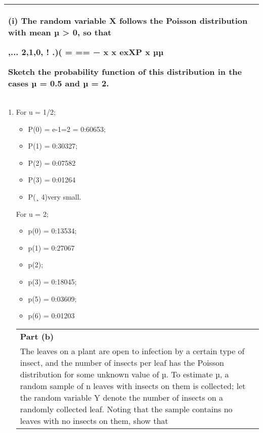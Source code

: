 \documentclass[a4paper,12pt]{article}
\begin{document}
  \begin{table}[ht!]
  \centering
  \begin{tabular}{|p{15cm}|}
  \hline
(i) The random variable X follows the Poisson distribution with mean µ > 0, so that 
 
   ,... 2,1,0, ! .)( = == − x x exXP x µµ
 
 
 Sketch the probability function of this distribution in the cases µ = 0.5 and µ = 2. 
 \\ \hline 
   \end{tabular}
 \end{table}
 

 


\begin{enumerate}
 \item  For u = 1/2; 
 
\begin{itemize}   
\item P(0) = e-1=2 = 0:60653; 
\item P(1) = 0:30327; 
\item P(2) = 0:07582
\item P(3) =
0:01264
\item P(¸ 4)very small.
\end{itemize}

For u = 2; 
\begin{itemize}   
\item p(0) = 0:13534; 
\item p(1) = 0:27067 
\item p(2); 
\item p(3) = 0:18045; 
\item p(5) = 0:03609; 
\item p(6) = 0:01203
\end{itemize}
  \begin{table}[ht!]
  \centering
  \begin{tabular}{|p{15cm}|}
  \hline
\noindent \textbf{Part (b)} \\ The leaves on a plant are open to infection by a certain type of insect, and the number of insects per leaf has the Poisson distribution for some unknown value of µ.  To estimate µ, a random sample of n leaves with insects on them is collected;  let the random variable Y denote the number of insects on a randomly collected leaf.  Noting that the sample contains no leaves with no insects on them, show that 
 

\end{tabular}
\end{table}
\end{enumerate}
\end{document}
